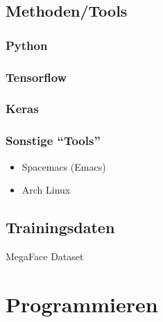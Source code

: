 \subsection{Methoden/Tools}

\subsubsection{Python}
\subsubsection{Tensorflow}
\subsubsection{Keras}
\subsubsection{Sonstige ``Tools''}
\begin{itemize}
\item{Spacemacs (Emacs)}
\item{Arch Linux}
\end{itemize}

\subsection{Trainingsdaten}
MegaFace Dataset

\section{Programmieren}

